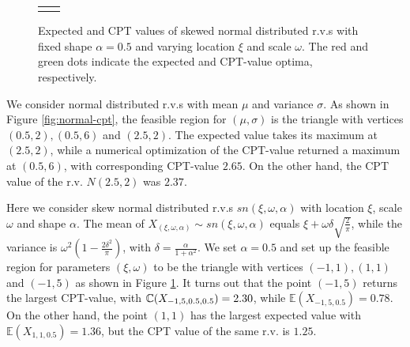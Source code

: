 \begin{figure}
\begin{minipage}{.6\textwidth}
\begin{tabular}{cc}
{{   }
   }
   \end{tabular}
\caption{Expected and CPT values of skewed normal distributed r.v.s with fixed shape $\alpha=0.5$ and varying location $\xi$ and scale $\omega$. The red and green dots indicate the expected and CPT-value optima, respectively.}
\label{fig:skewnormal}
\end{minipage}

\end{figure}
\begin{example}
We consider normal distributed r.v.s with mean $\mu$ and variance $\sigma$. As shown in Figure \ref{fig:normal-cpt}, the feasible region for $(\mu, \sigma)$ is the triangle with vertices $(0.5,2), (0.5,6)$ and $(2.5,2)$. The expected value takes its maximum at $(2.5, 2)$, while a numerical optimization of the CPT-value returned a maximum at $(0.5, 6)$, with corresponding CPT-value $2.65$. On the other hand, the CPT value of the r.v. $N(2.5, 2)$ was $2.37$.
\end{example}

\begin{example}
Here we consider skew normal distributed r.v.s $sn(\xi, \omega, \alpha)$ with location $\xi$, scale $\omega$ and shape $\alpha$.  
The mean of $X_{(\xi, \omega, \alpha)} \sim sn(\xi, \omega, \alpha)$ equals 
$\xi + \omega \delta \sqrt{\frac{2}{\pi}}$, while the  variance is
$\omega^2(1 - \frac{2\delta^2}{\pi})$, with $\delta = \frac{\alpha}{1 + \alpha^2}$.
We set $\alpha=0.5$ and set up the feasible region for parameters $(\xi, \omega)$ to be the triangle with vertices $(-1,1), (1,1)$ and $(-1,5)$ as shown in Figure \ref{fig:skewnormal}.  
It turns out that the point $(-1,5)$ returns the largest CPT-value, with $\mathbb{C}(X_{-1,5,0.5,0.5}) = 2.30$, while
$\mathbb{E}(X_{-1,5,0.5}) = 0.78$.
On the other hand, the point $(1,1)$ has the largest expected value with $\mathbb{E}(X_{1,1,0.5}) = 1.36$, but the CPT value of the same r.v. is $1.25$.
\end{example}


